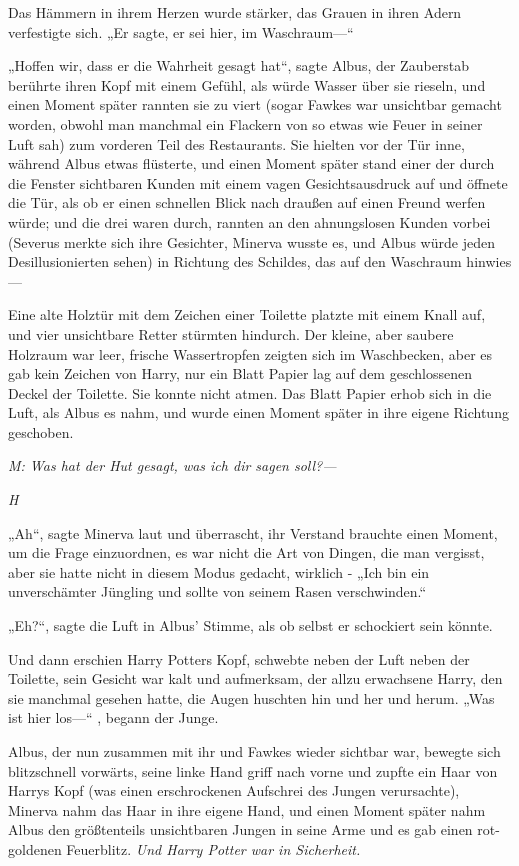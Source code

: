{Das Hämmern in ihrem Herzen wurde stärker, das Grauen in ihren Adern verfestigte sich. „Er sagte, er sei hier, im Waschraum—“

„Hoffen wir, dass er die Wahrheit gesagt hat“, sagte Albus, der Zauberstab berührte ihren Kopf mit einem Gefühl, als würde Wasser über sie rieseln, und einen Moment später rannten sie zu viert (sogar Fawkes war unsichtbar gemacht worden, obwohl man manchmal ein Flackern von so etwas wie Feuer in seiner Luft sah) zum vorderen Teil des Restaurants. Sie hielten vor der Tür inne, während Albus etwas flüsterte, und einen Moment später stand einer der durch die Fenster sichtbaren Kunden mit einem vagen Gesichtsausdruck auf und öffnete die Tür, als ob er einen schnellen Blick nach draußen auf einen Freund werfen würde; und die drei waren durch, rannten an den ahnungslosen Kunden vorbei (Severus merkte sich ihre Gesichter, Minerva wusste es, und Albus würde jeden Desillusionierten sehen) in Richtung des Schildes, das auf den Waschraum hinwies—

Eine alte Holztür mit dem Zeichen einer Toilette platzte mit einem Knall auf, und vier unsichtbare Retter stürmten hindurch. Der kleine, aber saubere Holzraum war leer, frische Wassertropfen zeigten sich im Waschbecken, aber es gab kein Zeichen von Harry, nur ein Blatt Papier lag auf dem geschlossenen Deckel der Toilette. Sie konnte nicht atmen. Das Blatt Papier erhob sich in die Luft, als Albus es nahm, und wurde einen Moment später in ihre eigene Richtung geschoben.

\emph{M: Was hat der Hut gesagt, was ich dir sagen soll?—}

\emph{H}

„Ah“, sagte Minerva laut und überrascht, ihr Verstand brauchte einen Moment, um die Frage einzuordnen, es war nicht die Art von Dingen, die man vergisst, aber sie hatte nicht in diesem Modus gedacht, wirklich - „Ich bin ein unverschämter Jüngling und sollte von seinem Rasen verschwinden.“

„Eh?“, sagte die Luft in Albus' Stimme, als ob selbst er schockiert sein könnte.

Und dann erschien Harry Potters Kopf, schwebte neben der Luft neben der Toilette, sein Gesicht war kalt und aufmerksam, der allzu erwachsene Harry, den sie manchmal gesehen hatte, die Augen huschten hin und her und herum. „Was ist hier los—“ , begann der Junge.

Albus, der nun zusammen mit ihr und Fawkes wieder sichtbar war, bewegte sich blitzschnell vorwärts, seine linke Hand griff nach vorne und zupfte ein Haar von Harrys Kopf (was einen erschrockenen Aufschrei des Jungen verursachte), Minerva nahm das Haar in ihre eigene Hand, und einen Moment später nahm Albus den größtenteils unsichtbaren Jungen in seine Arme und es gab einen rot-goldenen Feuerblitz. \emph{Und Harry Potter war in Sicherheit.}

}
